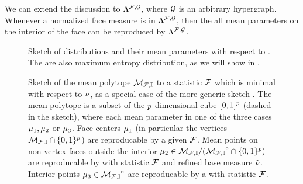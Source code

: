 We can extend the discussion to $\Lambda^{\mathcal{F},\mathcal{G}}$, where $\mathcal{G}$ is an arbitrary hypergraph.
Whenever a normalized face measure is in $\Lambda^{\mathcal{F},\mathcal{G}}$, then the all mean parameters on the interior of the face can be reproduced by $\Lambda^{\mathcal{F},\mathcal{G}}$.

%




\begin{figure}[t]
    \begin{center}
        
    \end{center}
    \caption{Sketch of distributions and their mean parameters with respect to .
    The \HybridLogicNetworks{} are also maximum entropy distribution, as we will show in .}
    \label{fig:reproducableSketch}
\end{figure}

\begin{figure}[t]
    \begin{center}
        
    \end{center}
    \caption{Sketch of the mean polytope ${\mathcal{M}_{\mathcal{F},\mathbb{I}}}$ to a statistic $\mathcal{F}$ which is minimal with respect to $\nu$, as a special case of the more generic sketch .
    The mean polytope is a subset of the $p$-dimensional cube $[0,1]^{p}$ (dashed in the sketch), where each mean parameter in one of the three cases $\mu_{1},\mu_{2}$ or $\mu_{3}$.
    \textcolor{\concolor}{Face centers} $\mu_{1}$ (in particular the vertices $\mathcal{M}_{\mathcal{F},\mathbb{I}}\cap\{0,1\}^{p}$) are reproducable by a \HardLogicNetwork{} given $\mathcal{F}$.
    Mean points on non-vertex faces outside the interior $\mu_{2}\in\mathcal{M}_{\mathcal{F},\mathbb{I}}/({\mathcal{M}_{\mathcal{F},\mathbb{I}}}^{\circ}\cap\{0,1\}^{p})$ are reproducable by \HybridLogicNetworks{} with statistic $\mathcal{F}$ and refined base measure $\tilde{\nu}$.
    \textcolor{\probcolor}{Interior points} $\mu_{3}\in{\mathcal{M}_{\mathcal{F},\mathbb{I}}}^{\circ}$ are reproducable by a \MarkovLogicNetwork{} with statistic $\mathcal{F}$.
    }\label{fig:meansetSketch}
\end{figure}


